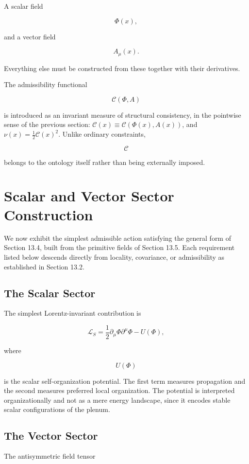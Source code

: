 \documentclass[11pt,oneside]{book}
\numberwithin{equation}{chapter}
\theoremstyle{definition}
\theoremstyle{plain}
\begin{document}
A scalar field

\[
\Phi(x),
\]

and a vector field

\[
A_\mu(x).
\]

Everything else must be constructed from these together with their
derivatives.

The admissibility functional

\[
\mathcal C(\Phi,A)
\]

is introduced as an invariant measure of structural consistency, in the
pointwise sense of the previous section: \(\mathcal C(x)\equiv
\mathcal C(\Phi(x),A(x))\), and \(\nu(x)=\tfrac12\mathcal C(x)^2\). Unlike
ordinary constraints,

\[
\mathcal C
\]

belongs to the ontology itself rather than being externally imposed.

\section{Scalar and Vector Sector Construction}

We now exhibit the simplest admissible action satisfying the general form of
Section 13.4, built from the primitive fields of Section 13.5. Each
requirement listed below descends directly from locality, covariance, or
admissibility as established in Section 13.2.

\subsection*{The Scalar Sector}

The simplest Lorentz-invariant contribution is

\[
\mathcal L_S
=
\frac12
\partial_\mu\Phi
\partial^\mu\Phi
-
U(\Phi),
\]

where

\[
U(\Phi)
\]

is the scalar self-organization potential. The first term measures propagation and the second measures preferred local organization. The potential is interpreted organizationally and not as a mere energy landscape, since it encodes stable scalar configurations of the plenum.

\subsection*{The Vector Sector}

The antisymmetric field tensor
\end{document}
